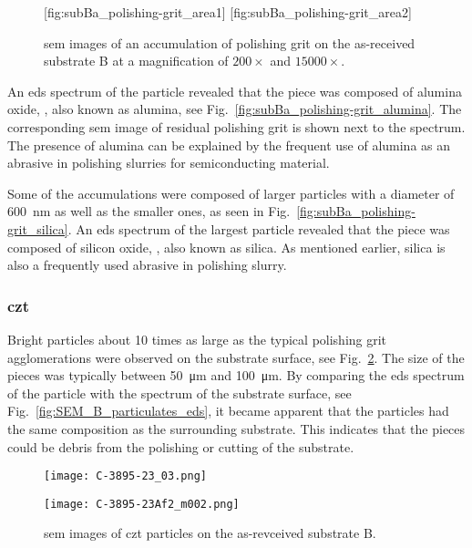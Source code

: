 \begin{figure}[htbp]
    \centering
        [fig:subBa_polishing-grit_area1]
        \hfill
        [fig:subBa_polishing-grit_area2]
    \caption[\Ac{sem} images of an accumulaton of polishing grit on substrate B.]{\Ac{sem} images of an accumulation of polishing grit on the as-received substrate B at a magnification of  $200\times$ and  $15000\times$.}\label{fig:subBa_polishing-grit_area}
\end{figure}

An \ac{eds} spectrum of the particle revealed that the piece was composed of alumina oxide, , also known as alumina, see Fig.~\ref{fig:subBa_polishing-grit_alumina}. The corresponding \ac{sem} image of residual polishing grit is shown next to the spectrum. The presence of alumina can be explained by the frequent use of alumina as an abrasive in polishing slurries for semiconducting material.

Some of the accumulations were composed of larger particles with a diameter of \SI{600}{\nano\metre} as well as the smaller ones, as seen in Fig.~\ref{fig:subBa_polishing-grit_silica}. An \ac{eds} spectrum of the largest particle revealed that the piece was composed of silicon oxide, , also known as silica. As mentioned earlier, silica is also a frequently used abrasive in polishing slurry.

\subsubsection{\Ac{czt}}
Bright particles about 10 times as large as the typical polishing grit agglomerations were observed on the substrate surface, see Fig.~\ref{fig:SEM_B_particulates}. The size of the pieces was typically between \SI{50}{\micro\metre} and \SI{100}{\micro\metre}. By comparing the \ac{eds} spectrum of the particle with the spectrum of the substrate surface, see Fig.~\ref{fig:SEM_B_particulates_eds}, it became apparent that the particles had the same composition as the surrounding substrate. This indicates that the pieces could be debris from the polishing or cutting of the substrate.

\begin{figure}[htbp]
    \centering
          \begin{minipage}[c]{0.49\linewidth}
            \centering
            \texttt{[image: C-3895-23\_03.png]}
          \end{minipage}
          \hfill
          \begin{minipage}[c]{0.49\linewidth}
            \centering
            \texttt{[image: C-3895-23Af2\_m002.png]}
          \end{minipage}
        \caption[\Ac{sem} images of \ac{czt} particles on as-revceived substrate B.]{\Ac{sem} images of \ac{czt} particles on the as-revceived substrate B.}\label{fig:SEM_B_particulates}  
\end{figure}


